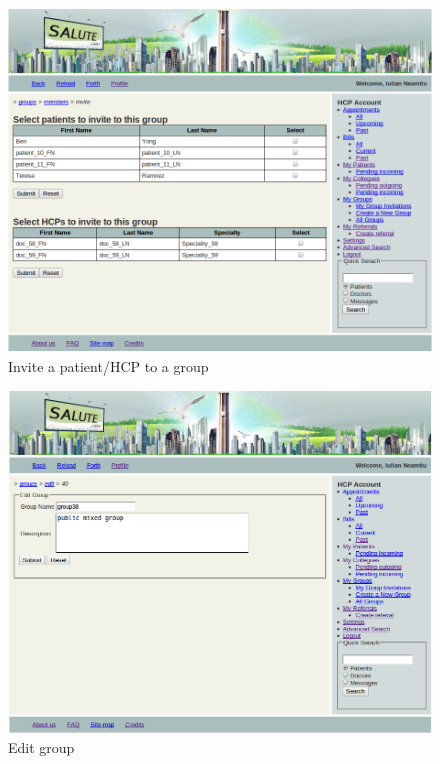 \begin{figure}
\includegraphics[scale=0.5]{screenshots/invite_members_to_group.png}
\caption{Invite a patient/HCP to a group}
\end{figure}

\begin{figure}
\includegraphics[scale=0.5]{screenshots/edit_group.png}
\caption{Edit group}
\end{figure}

